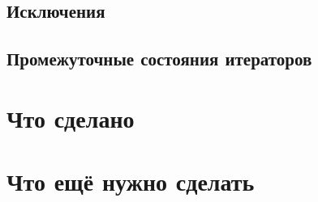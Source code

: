 \subsection{Исключения}


\subsection{Промежуточные состояния итераторов}



\section{Что сделано}



\section{Что ещё нужно сделать}
